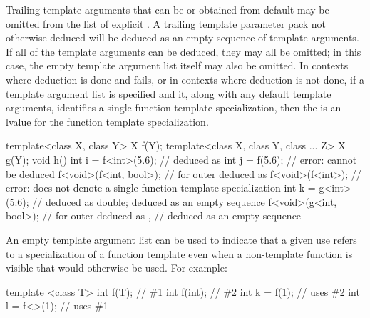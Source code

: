 \pnum
Trailing template arguments that can be  or
obtained from default
may be omitted from the list of explicit
.
A trailing template parameter pack not otherwise deduced will be
deduced as an empty sequence of template arguments.
If all of the template arguments can be deduced, they may all be omitted;
in this case, the empty template argument list
\tcode{<>}
itself may also be omitted.
In contexts where deduction is done and fails, or in contexts where
deduction is not done, if a template argument list is specified and it,
along with any default template arguments, identifies a single function
template specialization, then the
is an lvalue for the function template specialization.
\begin{example}
\begin{codeblock}
template<class X, class Y> X f(Y);
template<class X, class Y, class ... Z> X g(Y);
void h() {
  int i = f<int>(5.6);          //  deduced as 
  int j = f(5.6);               // error:  cannot be deduced
  f<void>(f<int, bool>);        //  for outer  deduced as 
  f<void>(f<int>);              // error:  does not denote a single function template specialization
  int k = g<int>(5.6);          //  deduced as double;  deduced as an empty sequence
  f<void>(g<int, bool>);        //  for outer  deduced as ,
                                //  deduced as an empty sequence
}
\end{codeblock}
\end{example}

\pnum
\begin{note}
An empty template argument list can be used to indicate that a given
use refers to a specialization of a function template even when a
non-template function is visible that would otherwise be used.
For example:

\begin{codeblock}
template <class T> int f(T);    // \#1
int f(int);                     // \#2
int k = f(1);                   // uses \#2
int l = f<>(1);                 // uses \#1
\end{codeblock}
\end{note}

